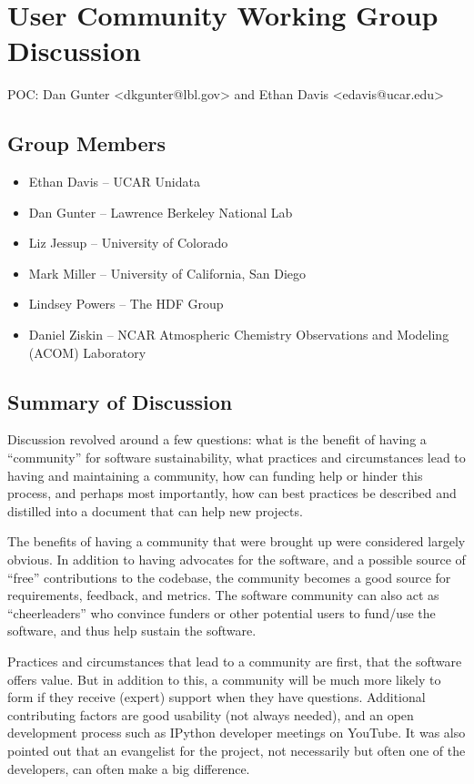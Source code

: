\section{User Community Working Group Discussion}
\label{sec:appendix_user_community}

POC:
Dan Gunter <dkgunter@lbl.gov> and 
Ethan Davis <edavis@ucar.edu>

\subsection{Group Members}

\begin{itemize}
\item Ethan Davis -- UCAR Unidata
\item Dan Gunter -- Lawrence Berkeley National Lab
\item Liz Jessup -- University of Colorado
\item Mark Miller -- University of California, San Diego
\item Lindsey Powers -- The HDF Group
\item Daniel Ziskin -- NCAR Atmospheric Chemistry Observations and Modeling (ACOM) Laboratory
\end{itemize}

\subsection{Summary of Discussion}

Discussion revolved around a few questions: what is the benefit of having a
``community'' for software sustainability, what practices and circumstances lead
to having and maintaining a community, how can funding help or hinder this
process, and perhaps most importantly, how can best practices be described and
distilled into a document that can help new projects.

The benefits of having a community that were brought up were considered largely
obvious. In addition to having advocates for the software, and a possible source
of ``free'' contributions to the codebase, the community becomes a good source
for requirements, feedback, and metrics. The software community can also act as
``cheerleaders'' who convince funders or other potential users to fund/use the
software, and thus help sustain the software.

Practices and circumstances that lead to a community are first, that the
software offers value. But in addition to this, a community will be much more
likely to form if they receive (expert) support when they have questions.
Additional contributing factors are good usability (not always needed), and an
open development process such as IPython developer meetings on YouTube. It was
also pointed out that an evangelist for the project, not necessarily but often
one of the developers, can often make a big difference.

